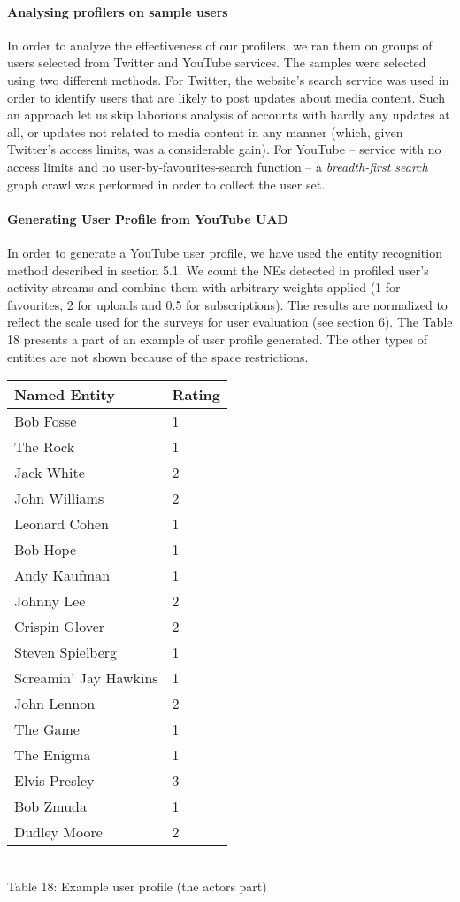\paragraph{Analysing profilers on sample users}
In order to analyze the effectiveness of our profilers, we ran them on groups of
users selected from Twitter and YouTube services. The samples were selected
using two different methods. For Twitter, the website's search service was used
in order to identify users that are likely to post updates about media content.
Such an approach let us skip laborious analysis of accounts with hardly any
updates at all, or updates not related to media content in any manner (which,
given Twitter's access limits, was a considerable gain). For YouTube -- service
with no access limits and no user-by-favourites-search function -- a \textit{breadth-first search}
graph crawl was performed in order to collect the user set.

\paragraph{Generating User Profile from YouTube UAD}

In order to generate a YouTube user profile, we have used the entity
recognition method described in section 5.1. We count the NEs detected in
profiled user's activity streams and combine them with arbitrary weights applied
(1 for favourites, 2 for uploads and 0.5 for subscriptions). The results are
normalized to reflect the scale used for the surveys for user evaluation (see section 6).
The Table 18
presents a part of an example of user profile generated. The other types of
entities are not shown because of the space restrictions.

\begin{center}
  \begin{tabular}{| l | l |}
Named Entity & Rating \\ \hline
Bob Fosse & 1 \\
The Rock & 1 \\
Jack White & 2 \\
John Williams & 2 \\
Leonard Cohen & 1 \\
Bob Hope & 1 \\
Andy Kaufman & 1 \\
Johnny Lee & 2 \\
Crispin Glover & 2 \\
Steven Spielberg & 1 \\
Screamin' Jay Hawkins & 1 \\
John Lennon & 2 \\
The Game & 1 \\
The Enigma & 1 \\
Elvis Presley & 3 \\
Bob Zmuda & 1 \\
Dudley Moore & 2 \\
  \end{tabular} \\
  Table 18: Example user profile (the actors part)
\end{center}

